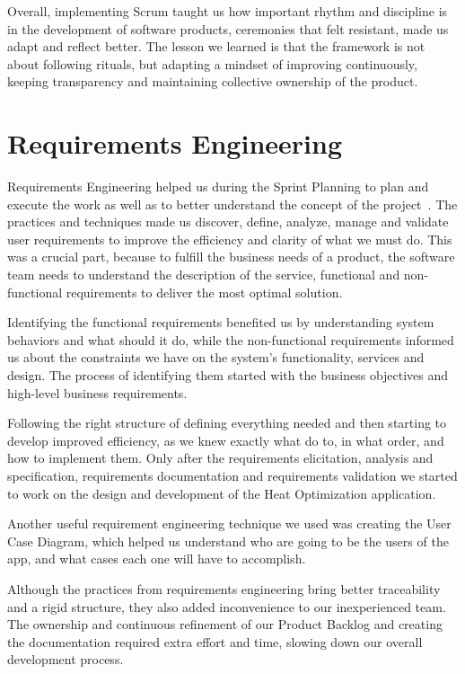 Overall, implementing Scrum taught us how important rhythm and discipline is in the development of software products, ceremonies that felt resistant, made us adapt and reflect better. The lesson we learned is that the framework is not about following rituals, but adapting a mindset of improving continuously, keeping transparency and maintaining collective ownership of the product.




\section{Requirements Engineering}

Requirements Engineering helped us during the Sprint Planning to plan and execute the work as well as to better understand the concept of the project~\cite{sommerville}. The practices and techniques made us discover, define, analyze, manage and validate user requirements to improve the efficiency and clarity of what we must do. This was a crucial part, because to fulfill the business needs of a product, the software team needs to understand the description of the service, functional and non-functional requirements to deliver the most optimal solution. 

Identifying the functional requirements benefited us by understanding system behaviors and what should it do, while the non-functional requirements informed us about the constraints we have on the system’s functionality, services and design. The process of identifying them started with the business objectives and high-level business requirements.

Following the right structure of defining everything needed and then starting to develop improved efficiency, as we knew exactly what do to, in what order, and how to implement them. Only after the requirements elicitation, analysis and specification, requirements documentation and requirements validation we started to work on the design and development of the Heat Optimization application. 

Another useful requirement engineering technique we used was creating the User Case Diagram, which helped us understand who are going to be the users of the app, and what cases each one will have to accomplish. 

Although the practices from requirements engineering bring better traceability and a rigid structure, they also added inconvenience to our inexperienced team. The ownership and continuous refinement of our Product Backlog and creating the documentation required extra effort and time, slowing down our overall development process. 

